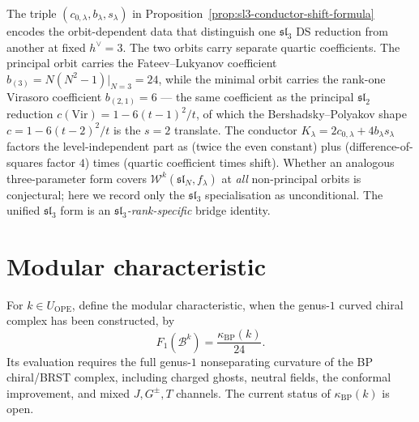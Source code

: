 \begin{remark}
\label{rem:shift-parameter-lie-theoretic}%
The triple $(c_{0,\lambda}, b_\lambda, s_\lambda)$ in
Proposition~\textup{\ref{prop:sl3-conductor-shift-formula}} encodes
the orbit-dependent data that distinguish
one $\mathfrak{sl}_3$ DS reduction from another at fixed $h^\vee = 3$.
The two orbits carry separate quartic coefficients.  The principal
orbit carries the Fateev--Lukyanov coefficient
$b_{(3)} = N(N^2{-}1)|_{N=3} = 24$, while the minimal orbit carries
the rank-one Virasoro coefficient $b_{(2,1)} = 6$ --- the same
coefficient as the principal $\mathfrak{sl}_2$ reduction
$c(\mathrm{Vir}) = 1 - 6(t-1)^2/t$, of which the
Bershadsky--Polyakov shape $c = 1 - 6(t-2)^2/t$ is the $s = 2$
translate. The conductor
$K_\lambda = 2c_{0,\lambda} + 4 b_\lambda s_\lambda$ factors the
level-independent part as
\textup{(}twice the even constant\textup{)} plus
\textup{(}difference-of-squares factor $4$\textup{)} times
\textup{(}quartic coefficient times shift\textup{)}. Whether an
analogous three-parameter form covers
$\mathcal{W}^k(\mathfrak{sl}_N, f_\lambda)$ at \emph{all} non-principal
orbits is conjectural; here we record only the $\mathfrak{sl}_3$
specialisation as unconditional. The unified $\mathfrak{sl}_3$ form is
an \emph{$\mathfrak{sl}_3$-rank-specific} bridge identity.
\end{remark}


\section{Modular characteristic}\label{sec:bp-kappa}

\begin{proposition}
\label{prop:bp-kappa}
For $k\in U_{\mathrm{OPE}}$, define the modular characteristic, when
the genus-$1$ curved chiral complex has been constructed, by
\begin{equation}\label{eq:bp-kappa}
F_1(\mathcal B^k)=\frac{\kappa_{\mathrm{BP}}(k)}{24}.
\end{equation}
Its evaluation requires the full genus-$1$ nonseparating curvature of
the BP chiral/BRST complex, including charged ghosts, neutral fields,
the conformal improvement, and mixed $J,G^\pm,T$ channels.  The current
status of $\kappa_{\mathrm{BP}}(k)$ is open.
\end{proposition}

